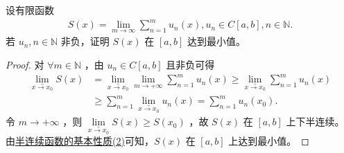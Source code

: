 \documentclass[../../main.tex]{subfiles}
\begin{document}
\begin{example}
设有限函数
\begin{align*}
S(x) = \lim_{m \to \infty} \sum_{n=1}^{m} u_n(x),  u_n \in C[a,b],  n \in \mathbb{N}.
\end{align*}
若 $u_n, n \in \mathbb{N}$ 非负，证明 $S(x)$ 在 $[a,b]$ 达到最小值。
\end{example}
\begin{proof}
对 $\forall m\in \mathbb{N}$ ，由 $u_n\in C\left[ a,b \right]$ 且非负可得
\begin{align*}
\underset{x\rightarrow x_0}{\underline{\lim }}S\left( x \right) &= \underset{x\rightarrow x_0}{\underline{\lim }}\underset{m\rightarrow +\infty}{\lim}\sum_{n=1}^m{u_n\left( x \right)} \geqslant \underset{x\rightarrow x_0}{\underline{\lim }}\sum_{n=1}^m{u_n\left( x \right)} \\
&\geqslant \sum_{n=1}^m{\underset{x\rightarrow x_0}{\underline{\lim }}u_n\left( x \right)} = \sum_{n=1}^m{u_n\left( x_0 \right)}.
\end{align*}
令 $m\rightarrow +\infty$ ，则 $\underset{x\rightarrow x_0}{\underline{\lim }}S\left( x \right) \geqslant S\left( x_0 \right)$ ，故 $S\left( x \right)$ 在 $\left[ a,b \right]$ 上下半连续。
由\hyperref[proposition:半连续函数基本性质]{半连续函数的基本性质(2)}可知，$S\left( x \right)$ 在 $\left[ a,b \right]$ 上达到最小值。
\end{proof}
\end{document}
